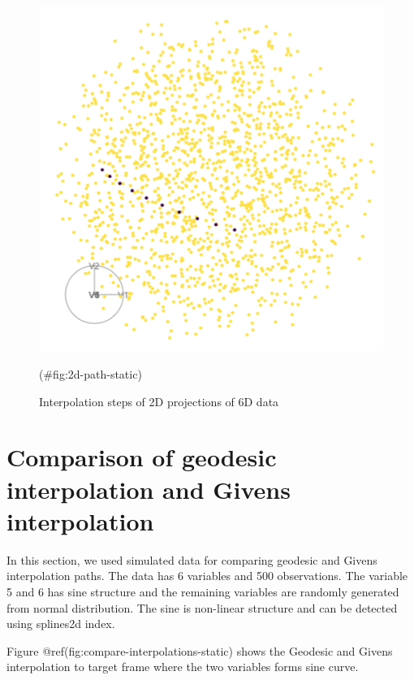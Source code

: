 \begin{figure}

{\centering \includegraphics[width=0.5\linewidth]{torus_static} 

}

\caption{Interpolation steps of 2D projections of 6D data}(\#fig:2d-path-static)
\end{figure}

\hypertarget{comparison-of-geodesic-interpolation-and-givens-interpolation}{%
\section{Comparison of geodesic interpolation and Givens interpolation}\label{comparison-of-geodesic-interpolation-and-givens-interpolation}}

In this section, we used simulated data for comparing geodesic and Givens interpolation paths. The data has 6 variables and 500 observations. The variable 5 and 6 has sine structure and the remaining variables are randomly generated from normal distribution. The sine is non-linear structure and can be detected using splines2d index.

Figure @ref(fig:compare-interpolations-static) shows the Geodesic and Givens interpolation to target frame where the two variables forms sine curve.

